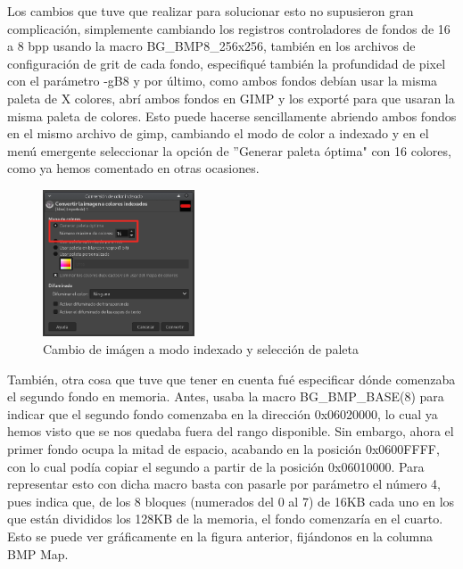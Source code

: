 Los cambios que tuve que realizar para solucionar esto no supusieron gran complicación, simplemente cambiando los registros controladores de fondos de 16 a 8 bpp usando la macro BG\_BMP8\_256x256, también en los archivos de configuración de grit de cada fondo, especifiqué también la profundidad de pixel con el parámetro -gB8 y por último, como ambos fondos debían usar la misma paleta de X colores, abrí ambos fondos en GIMP y los exporté para que usaran la misma paleta de colores. Esto puede hacerse sencillamente abriendo ambos fondos en el mismo archivo de gimp, cambiando el modo de color a indexado y en el menú emergente seleccionar la opción de ''Generar paleta óptima" con 16 colores, como ya hemos comentado en otras ocasiones.

\vspace{0.5cm}

\begin{figure}[htbp]
\centering
  \includegraphics[width=0.4\textwidth]{archivos/gimp_indexed.png}
  \caption{Cambio de imágen a modo indexado y selección de paleta}
  \label{fig:gimp_indexed}
\end{figure}


\vspace{0.5cm}

También, otra cosa que tuve que tener en cuenta fué especificar dónde comenzaba el segundo fondo en memoria. Antes, usaba la macro BG\_BMP\_BASE(8) para indicar que el segundo fondo comenzaba en la dirección 0x06020000, lo cual ya hemos visto que se nos quedaba fuera del rango disponible. Sin embargo, ahora el primer fondo ocupa la mitad de espacio, acabando en la posición 0x0600FFFF, con lo cual podía copiar el segundo a partir de la posición 0x06010000. Para representar esto con dicha macro basta con pasarle por parámetro el número 4, pues indica que, de los 8 bloques (numerados del 0 al 7) de 16KB cada uno  en los que están divididos los 128KB de la memoria, el fondo comenzaría en el cuarto. Esto se puede ver gráficamente  en la figura anterior, fijándonos en la columna BMP Map.

